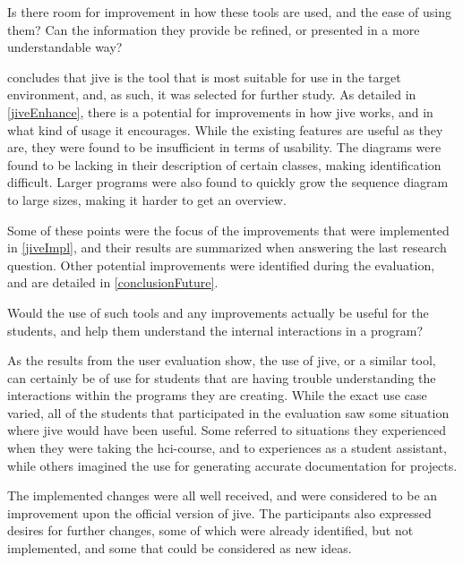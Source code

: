 \begin{theorem}
Is there room for improvement in how these tools are used, and the ease of using them? Can the information they provide be refined, or presented in a more understandable way?
\end{theorem}

 concludes that \gls{jive} is the tool that is most suitable for use in the target environment, and, as such, it was selected for further study.
As detailed in \cref{jiveEnhance}, there is a potential for improvements in how \gls{jive} works, and in what kind of usage it encourages.
While the existing features are useful as they are, they were found to be insufficient in terms of usability.
The diagrams were found to be lacking in their description of certain classes, making identification difficult.
Larger programs were also found to quickly grow the sequence diagram to large sizes, making it harder to get an overview.


Some of these points were the focus of the improvements that were implemented in \cref{jiveImpl}, and their results are summarized when answering the last research question.
Other potential improvements were identified during the evaluation, and are detailed in \cref{conclusionFuture}.


\begin{theorem}
Would the use of such tools and any improvements actually be useful for the students, and help them understand the internal interactions in a program?
\end{theorem}

As the results from the user evaluation show, the use of \gls{jive}, or a similar tool, can certainly be of use for students that are having trouble understanding the interactions within the programs they are creating.
While the exact use case varied, all of the students that participated in the evaluation saw some situation where \gls{jive} would have been useful.
Some referred to situations they experienced when they were taking the \gls{hci}-course, and to experiences as a student assistant, while others imagined the use for generating accurate documentation for projects.


The implemented changes were all well received, and were considered to be an improvement upon the official version of \gls{jive}.
The participants also expressed desires for further changes, some of which were already identified, but not implemented, and some that could be considered as new ideas.


